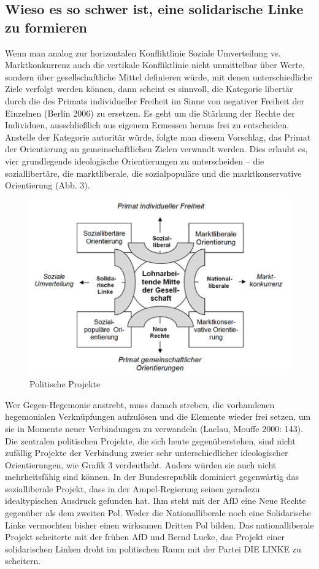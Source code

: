 \begin{multicols*}{2}
\section{Wieso es so schwer ist, eine solidarische Linke zu formieren}

\noindent Wenn man analog zur horizontalen Konfliktlinie Soziale Umverteilung vs. Marktkonkurrenz auch die vertikale Konfliktlinie nicht unmittelbar über Werte, sondern über gesellschaftliche Mittel definieren würde, mit denen unterschiedliche Ziele verfolgt werden können, dann scheint es sinnvoll, die Kategorie libertär durch die des Primats individueller Freiheit im Sinne von negativer Freiheit der Einzelnen (Berlin 2006) zu ersetzen. Es geht um die Stärkung der Rechte der Individuen, ausschließlich aus eigenem Ermessen heraus frei zu entscheiden. Anstelle der Kategorie autoritär würde, folgte man diesem Vorschlag, das Primat der Orientierung an gemeinschaftlichen Zielen verwandt werden. Dies erlaubt es, vier grundlegende ideologische Orientierungen zu unterscheiden – die soziallibertäre, die marktliberale, die sozialpopuläre und die marktkonservative Orientierung (Abb. 3).

\begin{figure}
    \centering
    \caption{Politische Projekte}
    \includegraphics[scale=0.8]{../Bilder/brie3.png} 
\end{figure}

Wer Gegen-Hegemonie anstrebt, muss danach streben, die vorhandenen hegemonialen Verknüpfungen aufzulösen und die Elemente wieder frei setzen, um sie in Momente neuer Verbindungen zu verwandeln (Laclau, Mouffe 2000: 143). Die zentralen politischen Projekte, die sich heute gegenüberstehen, sind nicht zufällig Projekte der Verbindung zweier sehr unterschiedlicher ideologischer Orientierungen, wie Grafik 3 verdeutlicht. Anders würden sie auch nicht mehrheitsfähig sind können. In der Bundesrepublik dominiert gegenwärtig das sozialliberale Projekt, dass in der Ampel-Regierung seinen geradezu idealtypischen Ausdruck gefunden hat. Ihm steht mit der AfD eine Neue Rechte gegenüber als dem zweiten Pol. Weder die Nationalliberale noch eine Solidarische Linke vermochten bisher einen wirksamen Dritten Pol bilden. Das nationalliberale Projekt scheiterte mit der frühen AfD und Bernd Lucke, das Projekt einer solidarischen Linken droht im politischen Raum mit der Partei DIE LINKE zu scheitern.


\end{multicols*}
